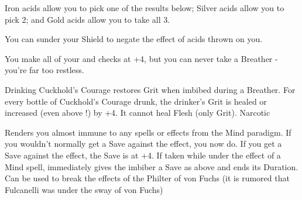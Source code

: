   Iron acids allow you to pick one of the results below; Silver acids allow you to pick 2; and Gold acids allow you to take all 3.


  You can sunder your Shield to negate the effect of acids thrown on you.  

  \cbreak


  \CHYMISTRY[
    Name=Chyme's Nerve Tonic,
    Link=chymistry-chymes-nerve-tonic,
    Cost=Iron (1 Research;100\FE),
    Duration=until Bivouac,
    Toxin=No,
    Narcotic=\MAX 1
  ]

  You make all of your \RO and \RB checks at +4, but you can never take a Breather - you're far too restless.  

\CHYMISTRY[
  Name=Cuckhold's Courage,
  Link=chymistry-cuckhold-courage,
  Cost=Iron (1 Research;100\FE),
  Duration=0,
  Toxin=No,
  Narcotic=\MAX 3 
]

Drinking Cuckhold's Courage restores Grit when imbibed during a Breather.  For every bottle of Cuckhold's Courage drunk, the drinker's Grit is healed or increased (even above \MAX !) by +4.  It cannot heal Flesh (only Grit).  Narcotic



\CHYMISTRY[
  Name=Fulcanelli's Clarifying Elixir,
  Link=chymistry-fulcanelli-clarifying-elixir,
  Cost=Silver (3 Research;300\AG),
  Duration=until Bivouac/0,
  Toxin=No,
  Narcotic=No 
]


Renders you almost immune to any spells or effects from the Mind paradigm.  If you wouldn't normally get a Save against the effect, you now do.  If you  get a Save against the effect, the Save is at +4.  If taken while under the effect of a Mind spell, immediately gives the imbiber a Save as above and ends its Duration.  Can be used to break the effects of the Philter of von Fuchs (it is rumored that Fulcanelli was under the sway of von Fuchs)

\CHYMISTRY[
  Name=Liebnitz Purgation,
  Link=chymistry-liebnitz-purgation,
  Cost=Silver (3 Research;300\AG),
  Duration=0 ,
  Toxin=No,
  Narcotic=No 
]

